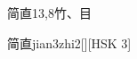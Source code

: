 \begin{entry}{简直}{13,8}{⽵、⽬}
  \begin{phonetics}{简直}{jian3zhi2}[][HSK 3]
  \end{phonetics}
\end{entry}
